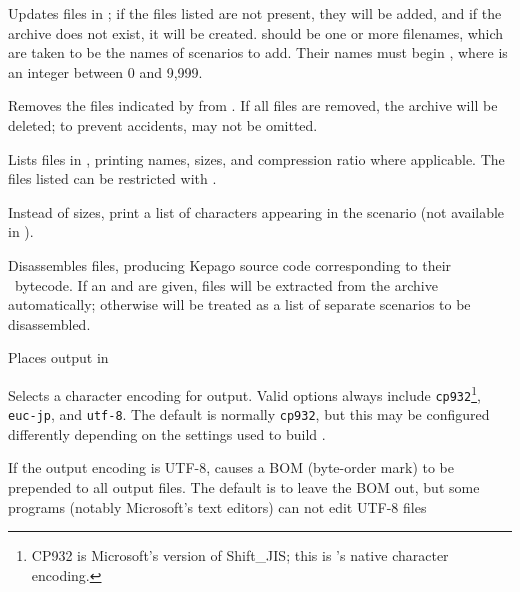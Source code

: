   \begin{nicelist}
  \item[\clboth{a}{add}]
    Updates files in ; if the files listed are not present,
    they will be added, and if the archive does not exist, it will be created.
     should be one or more filenames, which are taken to be the
    names of scenarios to add.  Their names must begin ,
    where  is an integer between 0 and 9,999.
  \item[\clboth{k}{delete}]
    Removes the files indicated by  from .  If
    all files are removed, the archive will be deleted; to prevent accidents,
     may not be omitted.
  \item[\clboth{l}{list}]
    Lists files in , printing names, sizes, and compression
    ratio where applicable.  The files listed can be restricted with
    .
    \begin{extraopts}
    \item[\clboth{N}{names}]
      Instead of sizes, print a list of characters appearing in the scenario
      (not available in \avgns).
    \end{extraopts}
  \item[\clboth{d}{disassemble}]
    Disassembles files, producing Kepago source code corresponding to their
    \reallive\ bytecode.  If an  and  are
    given, files will be extracted from the archive automatically; otherwise
     will be treated as a list of separate scenarios to be
    disassembled.
    \begin{extraopts}
    \item[\clbarg{o}{outdir}{DIR}]
      Places output in 
    \item[\clbarg{e}{encoding}{ENC}]\label{opt:enc}
      Selects a character encoding for output.  Valid options always include
      \texttt{cp932}\footnote{CP932 is Microsoft's version of Shift\_JIS; this
      is \reallive's native character encoding.}, \texttt{euc-jp}, and
      \texttt{utf-8}.  The default is normally \texttt{cp932}, but this may be
      configured differently depending on the settings used to build \package.
    \item[\cllong{bom}]
      If the output encoding is UTF-8, causes a BOM (byte-order mark) to be
      prepended to all output files.  The default is to leave the BOM out, but
      some programs (notably Microsoft's text editors) can not edit UTF-8 files

\end{extraopts}
\end{nicelist}
